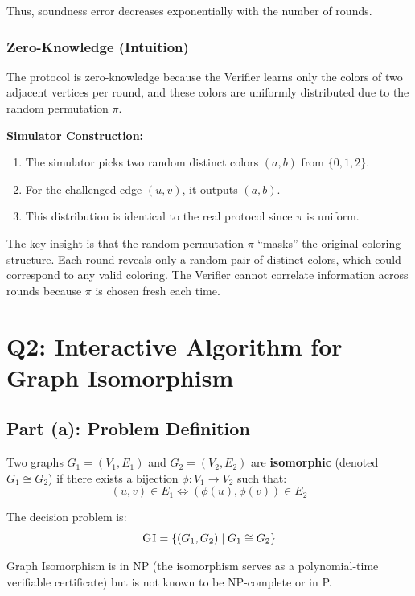 \documentclass[11pt]{article}
\begin{document}
Thus, soundness error decreases exponentially with the number of rounds.

\subsubsection{Zero-Knowledge (Intuition)}

The protocol is zero-knowledge because the Verifier learns only the colors of two adjacent vertices per round, and these colors are uniformly distributed due to the random permutation $\pi$.

\textbf{Simulator Construction:}
\begin{enumerate}
    \item The simulator picks two random distinct colors $(a, b)$ from $\{0, 1, 2\}$.
    \item For the challenged edge $(u, v)$, it outputs $(a, b)$.
    \item This distribution is identical to the real protocol since $\pi$ is uniform.
\end{enumerate}

The key insight is that the random permutation $\pi$ ``masks'' the original coloring structure. Each round reveals only a random pair of distinct colors, which could correspond to any valid coloring. The Verifier cannot correlate information across rounds because $\pi$ is chosen fresh each time.

\section{Q2: Interactive Algorithm for Graph Isomorphism}

\subsection{Part (a): Problem Definition}

Two graphs $G_1 = (V_1, E_1)$ and $G_2 = (V_2, E_2)$ are \textbf{isomorphic} (denoted $G_1 \cong G_2$) if there exists a bijection $\phi: V_1 \to V_2$ such that:
\[
(u, v) \in E_1 \iff (\phi(u), \phi(v)) \in E_2
\]

The decision problem is:
\[
\textsc{GI} = \{ (G_1, G_2) \mid G_1 \cong G_2 \}
\]

Graph Isomorphism is in NP (the isomorphism serves as a polynomial-time verifiable certificate) but is not known to be NP-complete or in P.
\end{document}
